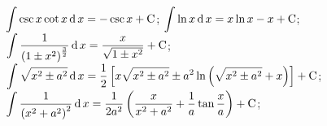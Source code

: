\begin{tabenum}[(1)]
  \tabenumitem $\displaystyle\int \csc x \cot x \operatorname{\mathop{}\!\mathrm{d}} x = - \csc x + \text{C}$;
  \tabenumitem $\displaystyle\int \ln x \operatorname{\mathop{}\!\mathrm{d}} x = x \ln x - x + \text{C}$;\\
  \tabenumitem $\displaystyle\int \dfrac{1}{\left( 1 \pm x^2 \right)^\frac{3}{2}} \operatorname{\mathop{}\!\mathrm{d}} x = \dfrac{x}{\sqrt{1 \pm x^2}} + \text{C}$;\\
  \tabenumitem $\displaystyle\int \sqrt{x^2 \pm a^2} \operatorname{\mathop{}\!\mathrm{d}} x = \dfrac{1}{2} \left[x\sqrt{x^2 \pm a^2} \pm a^2\ln \left( \sqrt{x^2 \pm a^2} + x \right) \right] + \text{C}$;\hidewidth\skipitem\\
  \tabenumitem $\displaystyle\int \dfrac{1}{\left( x^2 + a^2 \right)^2} \operatorname{\mathop{}\!\mathrm{d}} x = \dfrac{1}{2a^2} \left( \dfrac{x}{x^2 + a^2} + \dfrac{1}{a} \tan \dfrac{x}{a} \right) + \text{C}$;\hidewidth\skipitem\\
\end{tabenum}